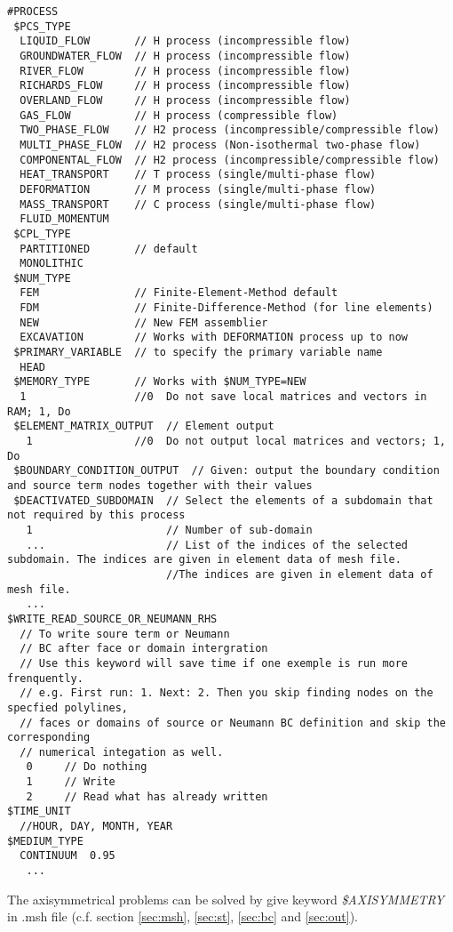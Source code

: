 \begin{verbatim}
#PROCESS
 $PCS_TYPE
  LIQUID_FLOW       // H process (incompressible flow)
  GROUNDWATER_FLOW  // H process (incompressible flow)
  RIVER_FLOW        // H process (incompressible flow)
  RICHARDS_FLOW     // H process (incompressible flow)
  OVERLAND_FLOW     // H process (incompressible flow)
  GAS_FLOW          // H process (compressible flow)
  TWO_PHASE_FLOW    // H2 process (incompressible/compressible flow)
  MULTI_PHASE_FLOW  // H2 process (Non-isothermal two-phase flow)
  COMPONENTAL_FLOW  // H2 process (incompressible/compressible flow)
  HEAT_TRANSPORT    // T process (single/multi-phase flow)
  DEFORMATION       // M process (single/multi-phase flow)
  MASS_TRANSPORT    // C process (single/multi-phase flow)
  FLUID_MOMENTUM
 $CPL_TYPE
  PARTITIONED       // default
  MONOLITHIC
 $NUM_TYPE
  FEM               // Finite-Element-Method default
  FDM               // Finite-Difference-Method (for line elements)
  NEW               // New FEM assemblier
  EXCAVATION        // Works with DEFORMATION process up to now
 $PRIMARY_VARIABLE  // to specify the primary variable name
  HEAD
 $MEMORY_TYPE       // Works with $NUM_TYPE=NEW
  1                 //0  Do not save local matrices and vectors in RAM; 1, Do
 $ELEMENT_MATRIX_OUTPUT  // Element output
   1                //0  Do not output local matrices and vectors; 1, Do
 $BOUNDARY_CONDITION_OUTPUT  // Given: output the boundary condition and source term nodes together with their values  
 $DEACTIVATED_SUBDOMAIN  // Select the elements of a subdomain that not required by this process
   1                     // Number of sub-domain
   ...                   // List of the indices of the selected subdomain. The indices are given in element data of mesh file.
                         //The indices are given in element data of mesh file.
   ...
$WRITE_READ_SOURCE_OR_NEUMANN_RHS
  // To write soure term or Neumann
  // BC after face or domain intergration
  // Use this keyword will save time if one exemple is run more frenquently.
  // e.g. First run: 1. Next: 2. Then you skip finding nodes on the specfied polylines,
  // faces or domains of source or Neumann BC definition and skip the corresponding
  // numerical integation as well.
   0     // Do nothing
   1     // Write
   2     // Read what has already written
$TIME_UNIT
  //HOUR, DAY, MONTH, YEAR
$MEDIUM_TYPE
  CONTINUUM  0.95
   ...
\end{verbatim}
The axisymmetrical problems can be solved by give keyword
\textit{\mbox{\$AXISYMMETRY}} in .msh file (c.f. section
\ref{sec:msh}, \ref{sec:st}, \ref{sec:bc} and \ref{sec:out}).


